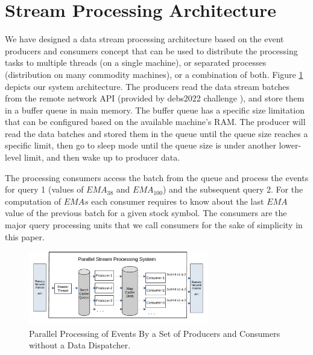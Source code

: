 \section{Stream Processing Architecture}\label{sec:concepts}
We have designed a data stream processing architecture based on the event producers and consumers concept that can be used to distribute the processing tasks to multiple threads (on a single machine), or  separated processes (distribution on many commodity machines), or a combination of both. 
Figure \ref{fig:parallel-srream-processing1} depicts our system architecture. The producers read the data stream batches from the remote  network API (provided by debs2022 challenge \cite{debs2022challenge}), and store them in a buffer queue in main memory. 
The buffer queue has a specific size limitation that can be configured based  on the available machine's RAM. The producer will read the data batches and stored them in the queue until the queue size reaches a specific limit, then go to sleep mode until the queue size is under another lower-level limit, and then wake up to producer data. 

The processing consumers access the batch from the queue and process the events for query 1 (values of $EMA_{38}$ and $EMA_{100}$) 
and the subsequent query 2. For the computation of $EMAs$ each consumer requires to know about the last $EMA$ value of the previous batch for a given stock symbol. 
The consumers are the major query processing units that we call consumers for the sake of simplicity in this paper. 

\begin{figure}[!ht]
    \begin{center}
        \includegraphics[width=0.7\textwidth]{./images/Parallel-Stream-Processing-System_v2}
        \caption{Parallel Processing of Events By a Set of Producers and Consumers without a Data Dispatcher.}
        \label{fig:parallel-srream-processing1}
    \end{center}
\end{figure}

